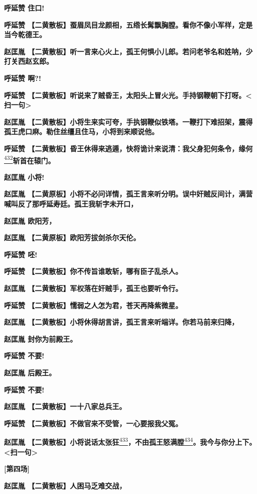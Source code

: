 \textbf{呼延赞 住口!}

\textbf{呼延赞
【二黄散板】蚕眉凤目龙颜相，五绺长髯飘胸膛。看你不像小军样，定是当今乾德王。}

\textbf{赵匡胤
【二黄散板】听一言来心火上，孤王何惧小儿郎。若问老爷名和姓呐，少打关西赵玄郎。}

\textbf{呼延赞 啊?!}

\textbf{呼延赞
【二黄散板】听说来了贼昏王，太阳头上冒火光。手持钢鞭朝下打呀。\textless{}扫一句\textgreater{}}

\textbf{赵匡胤
【二黄散板】小将生来实可夸，手执钢鞭似铁塔。一鞭打下难招架，震得孤王虎口麻。勒住丝缰且住马，小将到来顺说他。}

\textbf{呼延赞
【二黄散板】昏王休得来逃遁，快将诡计来说清：我父身犯何条令，缘何}\protect\hyperlink{fn432}{\textsuperscript{432}}\textbf{斩首在辕门。}

\textbf{赵匡胤 小将!}

\textbf{赵匡胤
【二黄原板】小将不必问详情，孤王言来听分明。误中奸贼反间计，满营喊叫反了那呼延寿廷。孤王我斩字未开口，}

\textbf{赵匡胤 欧阳芳，}

\textbf{赵匡胤 【二黄原板】欧阳芳拔剑杀尔天伦。}

\textbf{呼延赞 呸!}

\textbf{呼延赞 【二黄散板】你不传旨谁敢斩，哪有臣子乱杀人。}

\textbf{赵匡胤 【二黄散板】军权落在奸贼手，孤王也要听令行。}

\textbf{呼延赞 【二黄散板】懦弱之人怎为君，苍天再降紫微星。}

\textbf{赵匡胤
【二黄散板】小将休得胡言讲，孤王言来听端详。你若马前来归降，}

\textbf{赵匡胤 封你为前殿王。}

\textbf{呼延赞 不要!}

\textbf{赵匡胤 后殿王。}

\textbf{呼延赞 不要!}

\textbf{赵匡胤 【二黄散板】一十八家总兵王。}

\textbf{呼延赞 【二黄散板】不做官来不受管，一心要报我父冤。}

\textbf{赵匡胤
【二黄散板】小将说话太张狂}\protect\hyperlink{fn433}{\textsuperscript{433}}\textbf{，不由孤王怒满膛}\protect\hyperlink{fn434}{\textsuperscript{434}}\textbf{。我今与你分上下。\textless{}扫一句\textgreater{}}

\textbf{{[}第四场{]}}

\textbf{赵匡胤 【二黄散板】人困马乏难交战，}


